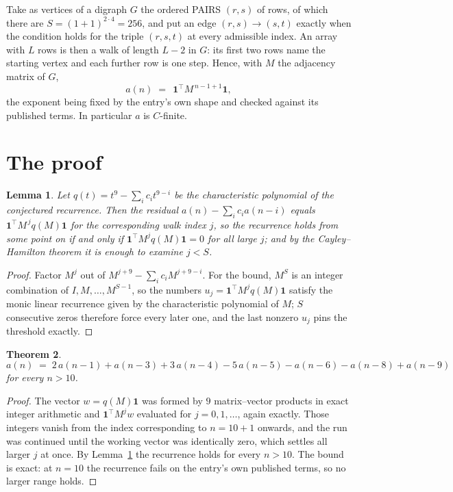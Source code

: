 \documentclass[11pt,a4paper]{article}
\theoremstyle{plain}
\newtheorem{theorem}{Theorem}
\newtheorem{lemma}[theorem]{Lemma}
\theoremstyle{definition}
\begin{document}
Take as vertices of a digraph $G$ the ordered PAIRS $(r,s)$ of rows, of which there are
$S=(1+1)^{2\cdot4}=256$, and put an edge $(r,s)\to(s,t)$ exactly when the condition
holds for the triple $(r,s,t)$ at every admissible index. An array with $L$ rows is then a
walk of length $L-2$ in $G$: its first two rows name the starting vertex and each further
row is one step. Hence, with $M$ the adjacency matrix of $G$,
\[
a(n)\;=\;\,\mathbf{1}^{\!\top}M^{\,n-1+1}\mathbf{1},
\]
the exponent being fixed by the entry's own shape and checked against its published terms.
In particular $a$ is $C$-finite.

\section{The proof}

\begin{lemma}\label{lem:crit}
Let $q(t)=t^{9}-\sum_i c_it^{9-i}$ be the characteristic polynomial of the
conjectured recurrence. Then the residual $a(n)-\sum_ic_ia(n-i)$ equals
$\mathbf{1}^{\!\top}M^{\,j}q(M)\mathbf{1}$ for the corresponding walk index
$j$, so the recurrence holds from some point on if and only if
$\mathbf{1}^{\!\top}M^{j}q(M)\mathbf{1}=0$ for all large $j$; and by the
Cayley--Hamilton theorem it is enough to examine $j<S$.
\end{lemma}

\begin{proof}
Factor $M^{j}$ out of $M^{j+9}-\sum_ic_iM^{j+9-i}$. For the bound, $M^{S}$
is an integer combination of $I,M,\dots,M^{S-1}$, so the numbers
$u_j=\mathbf{1}^{\!\top}M^{j}q(M)\mathbf{1}$ satisfy the monic linear recurrence given by
the characteristic polynomial of $M$; $S$ consecutive zeros therefore force every later one,
and the last nonzero $u_j$ pins the threshold exactly.
\end{proof}

\begin{theorem}
\[
a(n)\;=\;2\,a(n-1) + a(n-3) + 3\,a(n-4) - 5\,a(n-5) - a(n-6) - a(n-8) + a(n-9)
\]
for every $n>10$.
\end{theorem}

\begin{proof}
The vector $w=q(M)\mathbf{1}$ was formed by $9$ matrix--vector products in exact
integer arithmetic and $\mathbf{1}^{\!\top}M^{j}w$ evaluated for $j=0,1,\dots$, again
exactly. Those integers vanish from the index corresponding to $n=10+1$ onwards, and the
run was continued until the working vector was identically zero, which settles all larger $j$
at once. By Lemma~\ref{lem:crit} the recurrence holds for every $n>10$. The bound is exact: at $n=10$ the recurrence fails on the entry's own published terms, so no larger range holds.
\end{proof}
\end{document}
